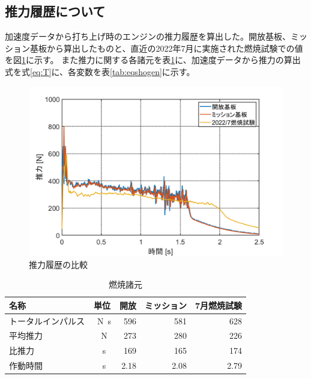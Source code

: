 \documentclass[a4paper,11pt,uplatex]{jsarticle}
\begin{document}
\subsection{推力履歴について}
\label{suiryokurireki}
加速度データから打ち上げ時のエンジンの推力履歴を算出した。開放基板、ミッション基板から算出したものと、直近の2022年7月に実施された燃焼試験での値を図\ref{fig:suiryokurireki}に示す。
また推力に関する各諸元を表\ref{tab:nenshoushogen}に、加速度データから推力の算出式を式\eqref{eq:T}に、各変数を表\ref{tab:eqshogen}に示す。

\begin{figure}[H]
	\centering
	\includegraphics[width=0.7\linewidth]{pic_sim/acc_thrust.png}
	\caption{推力履歴の比較}
	\label{fig:suiryokurireki}
\end{figure}

\begin{table}[H]
	\centering
	\caption{燃焼諸元}
	\label{tab:nenshoushogen}
	\begin{tabular}{lcrrr}
		\hline
		名称        & 単位         & \multicolumn{1}{c}{開放} & \multicolumn{1}{c}{ミッション} & \multicolumn{1}{c}{7月燃焼試験} \\
		\hline
		トータルインパルス & \SI{}{N.s} & 596                    & 581                       & 628                        \\
		平均推力      & \SI{}{N}   & 273                    & 280                       & 226                        \\
		比推力       & \SI{}{s}   & 169                    & 165                       & 174                        \\
		作動時間      & \SI{}{s}   & 2.18                   & 2.08                      & 2.79                       \\
		\hline
	\end{tabular}
\end{table}
\end{document}
